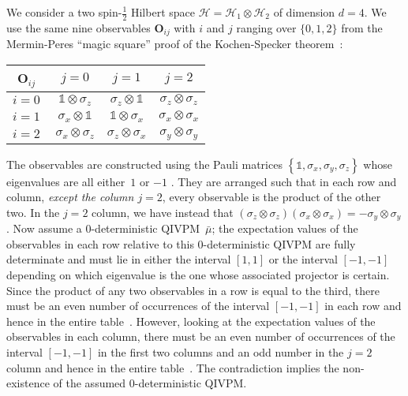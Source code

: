 \documentclass[english,reprint, aps, prl,superscriptaddress, showpacs,
showkeys, longbibliography, amsmath, amssymb, floatfix]{revtex4-1}
\theoremstyle{plain}
\theoremstyle{definition}
\newcommand{\Hilb}{\mathcal{H}}
\begin{document}
We consider a two spin-$\frac{1}{2}$ Hilbert space
$\Hilb=\Hilb_1\otimes\Hilb_2$ of dimension $d=4$. We use the same nine
observables $\mathbf{O}_{ij}$ with $i$ and $j$ ranging over
$\{0,1,2\}$ from the Mermin-Peres ``magic square'' proof of the
Kochen-Specker theorem~\cite{Mermin1990Simple,peres1995quantum,Griffiths2003}:

{\renewcommand{\arraystretch}{2}%
\begin{center}
\begin{tabular}{r|@{\quad}c@{\quad}|@{\quad}c@{\quad}|@{\quad}c@{\quad}|}
$\mathbf{O}_{ij}$~ & $j=0$ & $j=1$ & $j=2$ \\
\hline 
$i=0~$ & $\mathbb{1}\otimes\sigma_{z}$  & $\sigma_{z}\otimes\mathbb{1}$  & $\sigma_{z}\otimes\sigma_{z}$ \tabularnewline
\hline 
$i=1~$ & $\sigma_{x}\otimes\mathbb{1}$  & $\mathbb{1}\otimes\sigma_{x}$  & $\sigma_{x}\otimes\sigma_{x}$ \tabularnewline
\hline 
$i=2~$ & $\sigma_{x}\otimes\sigma_{z}$  & $\sigma_{z}\otimes\sigma_{x}$  & $\sigma_{y}\otimes\sigma_{y}$ \tabularnewline
\hline 
\end{tabular}
\par\end{center}
} 

\noindent The observables are constructed using the Pauli matrices
$\left\{ \mathbb{1},\sigma_{x},\sigma_{y},\sigma_{z}\right\}$ whose
eigenvalues are all either~$1$ or $-1$
\cite{Redhead1987-REDINA,544199,Griffiths2003,Jaeger2007,Mermin2007}.
They are arranged such that in
each row and column, \emph{except the column $j=2$}, every observable
is the product of the other two. In the $j=2$ column, we have instead
that
$\left(\sigma_{z}\otimes\sigma_{z}\right)\left(\sigma_{x}\otimes\sigma_{x}\right)=-\sigma_{y}\otimes\sigma_{y}$. Now
assume a 0-deterministic QIVPM~${\bar{\mu}}$; the expectation values
of the observables in each row relative to this 0-deterministic QIVPM
are fully determinate and must lie in either the interval $[1,1]$ or
the interval $[-1,-1]$ depending on which eigenvalue is the one whose
associated projector is certain. Since the product of any two
observables in a row is equal to the third, there must be an even
number of occurrences of the interval $[-1,-1]$ in each row and hence
in the entire table~\citep{TaiThesis2018}. However, looking at the expectation values of the
observables in each column, there must be an even number of
occurrences of the interval $[-1,-1]$ in the first two columns and an
odd number in the $j=2$ column and hence in the entire table~\citep{TaiThesis2018}. The
contradiction implies the non-existence of the assumed 0-deterministic
QIVPM. 
\end{document}
